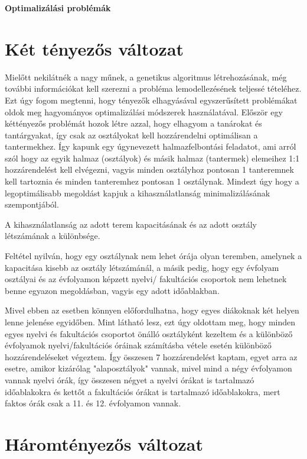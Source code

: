 \documentclass[a4paper,12pt]{article}
\begin{document}
\begin{center}
    \huge \textbf{Optimalizálási problémák} 
\end{center}

\section{Két tényezős változat}

Mielőtt nekilátnék a nagy műnek, a genetikus algoritmus létrehozásának, még további
információkat kell szerezni a probléma lemodellezésének teljessé tételéhez. Ezt úgy fogom
megtenni, hogy tényezők elhagyásával egyszerűsített problémákat oldok meg hagyományos
optimalizálási módszerek használatával. Először egy kéttényezős problémát hozok létre azzal,
hogy elhagyom a tanárokat és tantárgyakat, így csak az osztályokat kell hozzárendelni
optimálisan a tantermekhez. Így kapunk egy úgynevezett halmazfelbontási feladatot, ami arról
szól hogy az egyik halmaz (osztályok) és másik halmaz (tantermek) elemeihez 1:1
hozzárendelést kell elvégezni, vagyis minden osztályhoz pontosan 1 tanteremnek kell tartoznia
és minden tanteremhez pontosan 1 osztálynak.
Mindezt úgy hogy a legoptimálisabb megoldást
kapjuk a kihasználatlanság minimalizálásának szempontjából.

A kihasználatlanság az adott
terem kapacitásának és az adott osztály létszámának a különbsége.

Feltétel nyilván, hogy egy
osztálynak nem lehet órája olyan teremben, amelynek a kapacitása kisebb az osztály
létszámánál, a másik pedig, hogy egy évfolyam osztályai és az évfolyamon képzett nyelvi/
fakultációs csoportok nem lehetnek benne egyazon megoldásban, vagyis egy adott időablakban.

Mivel ebben az esetben könnyen előfordulhatna, hogy egyes diákoknak két helyen lenne jelenése
egyidőben. Mint látható lesz, ezt úgy oldottam meg, hogy minden egyes nyelvi és fakultációs
csoportot önálló osztályként kezeltem és a különböző évfolyamok nyelvi/fakultációs óráinak
számításba vétele esetén különböző hozzárendeléseket végeztem. Így összesen 7 hozzárendelést
kaptam, egyet arra az esetre, amikor kizárólag "alaposztályok" vannak, mivel mind a négy
évfolyamon vannak nyelvi órák, így összesen négyet a nyelvi órákat is tartalmazó
időablakokra és kettőt a fakultációs órákat is tartalmazó időablakokra, mert faktos órák
csak a 11. és 12. évfolyamon vannak.

\section{Háromtényezős változat}
\end{document}
